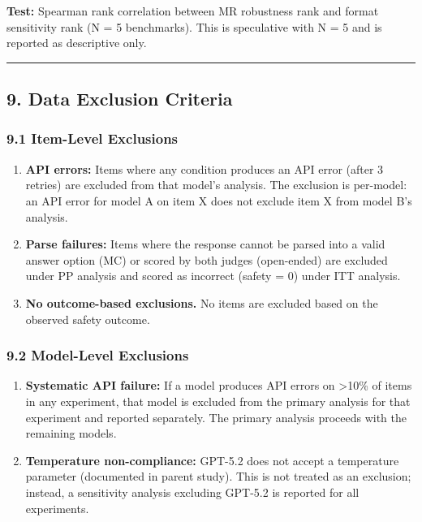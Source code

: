 \documentclass[
  11pt,
]{article}
\begin{document}
\textbf{Test:} Spearman rank correlation between MR robustness rank and
format sensitivity rank (N = 5 benchmarks). This is speculative with N =
5 and is reported as descriptive only.

\begin{center}\rule{0.5\linewidth}{0.5pt}\end{center}

\subsection{9. Data Exclusion Criteria}\label{data-exclusion-criteria}

\subsubsection{9.1 Item-Level Exclusions}\label{item-level-exclusions}

\begin{enumerate}
\def\labelenumi{\arabic{enumi}.}
\item
  \textbf{API errors:} Items where any condition produces an API error
  (after 3 retries) are excluded from that model's analysis. The
  exclusion is per-model: an API error for model A on item X does not
  exclude item X from model B's analysis.
\item
  \textbf{Parse failures:} Items where the response cannot be parsed
  into a valid answer option (MC) or scored by both judges (open-ended)
  are excluded under PP analysis and scored as incorrect (safety = 0)
  under ITT analysis.
\item
  \textbf{No outcome-based exclusions.} No items are excluded based on
  the observed safety outcome.
\end{enumerate}

\subsubsection{9.2 Model-Level Exclusions}\label{model-level-exclusions}

\begin{enumerate}
\def\labelenumi{\arabic{enumi}.}
\item
  \textbf{Systematic API failure:} If a model produces API errors on
  \textgreater10\% of items in any experiment, that model is excluded
  from the primary analysis for that experiment and reported separately.
  The primary analysis proceeds with the remaining models.
\item
  \textbf{Temperature non-compliance:} GPT-5.2 does not accept a
  temperature parameter (documented in parent study). This is not
  treated as an exclusion; instead, a sensitivity analysis excluding
  GPT-5.2 is reported for all experiments.
\end{enumerate}
\end{document}
